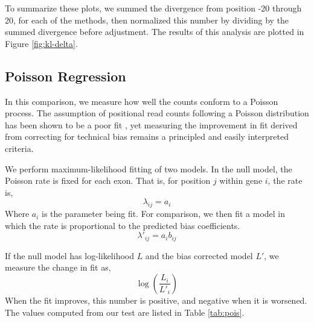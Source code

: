 \documentclass{bioinfo}
\begin{document}
To summarize these plots, we summed the divergence from position -20
through 20, for each of the methods, then normalized this number by dividing by
the summed divergence before adjustment. The results of this analysis are plotted in
Figure \ref{fig:kl-delta}.

\begin{comment}
\begin{figurehere}
\begin{center}
\texttt{[image: fig/kl-delta.pdf]}
\end{center}
\caption{Summed KL divergence, normalized by unadjusted divergence, so that a
number less than 1 indicates a decrease in divergence, or an increase in
uniformity.}
\label{fig:kl-delta}
\end{figurehere}
\end{comment}


\subsection{Poisson Regression}

In this comparison, we measure how well the counts conform to a Poisson process.
The assumption of positional read counts following a Poisson distribution has
been shown to be a poor fit \cite{Srivastava2010}, yet measuring the improvement in
fit derived from correcting for technical bias remains a principled and easily
interpreted criteria.

We perform maximum-likelihood fitting of two models. In the null model, the
Poisson rate is fixed for each exon. That is, for position $j$ within
gene $i$, the rate is,
$$ \lambda_{ij} = a_i $$
Where $a_i$ is the parameter being fit. For comparison, we then fit a model in
which the rate is proportional to the predicted bias coefficients.
$$ \lambda'_{ij} = a_i b_{ij} $$

If the null model has log-likelihood $L$ and the bias corrected model
$L'$, we measure the change in fit as,
$$ \log \left( \frac{ L_{i} } { L'_{i} } \right) $$
When the fit improves, this number is positive, and negative when it is
worsened. The values computed from our test are listed in Table \ref{tab:pois}.
\end{document}
